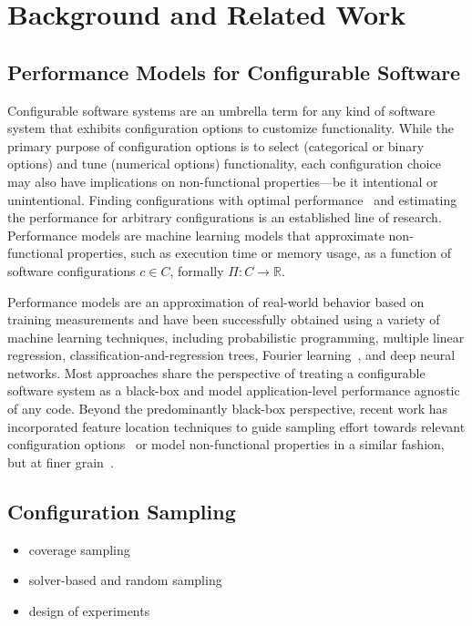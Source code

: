 \section{Background and Related Work}
\subsection{Performance Models for Configurable Software}
Configurable software systems are an umbrella term for any kind of software system that exhibits configuration options to customize functionality. 
While the primary purpose of configuration options is to select (categorical or binary options) and tune (numerical options) functionality, each configuration choice may also have implications on non-functional properties---be it intentional or unintentional. Finding configurations with optimal performance~\cite{nairUsingBadLearners2017,nairFlash18,ohFindingNearoptimalConfigurations2017} and estimating the performance for arbitrary configurations is an established line of research\cite{siegmundPerformanceinfluenceModelsHighly2015,haDeepPerf2019,perfAL,guoVariabilityawarePerformancePrediction2013,sarkarCostEfficientSamplingPerformance,guo_2018_data,fourier_learning_2015,perLasso}. 
Performance models are machine learning models that approximate non-functional properties, such as execution time or memory usage, as a function of software configurations $c \in C$, formally $\Pi: C \rightarrow \mathbb{R}$.

Performance models are an approximation of real-world behavior based on training measurements and have been successfully obtained using a variety of machine learning techniques, including probabilistic programming\cite{dorn2020}, multiple linear regression\cite{siegmundPerformanceinfluenceModelsHighly2015}, classification-and-regression trees\cite{sarkarCostEfficientSamplingPerformance,guo_2018_data}, Fourier learning~\cite{fourier_learning_2015,perLasso}, and deep neural networks\cite{haDeepPerf2019,perfAL}. Most approaches share the perspective of treating a configurable software system as a black-box and model application-level performance agnostic of any code. 
Beyond the predominantly black-box perspective, recent work has incorporated feature location techniques to guide sampling effort towards relevant configuration options~\cite{velez_2020_configcrusher_jase,velez_comprex_2021} or model non-functional properties in a similar fashion, but at finer grain~\cite{weber_white_2021}.

\subsection{Configuration Sampling}
\begin{itemize}
	\item coverage sampling~\cite{siegmundPredictingPerformanceAutomated2012}
	\item solver-based and random sampling~\cite{ohFindingNearoptimalConfigurations2017,henardCombining2015,kaltenecker_distance-based_2019}
	\item design of experiments
\end{itemize}

